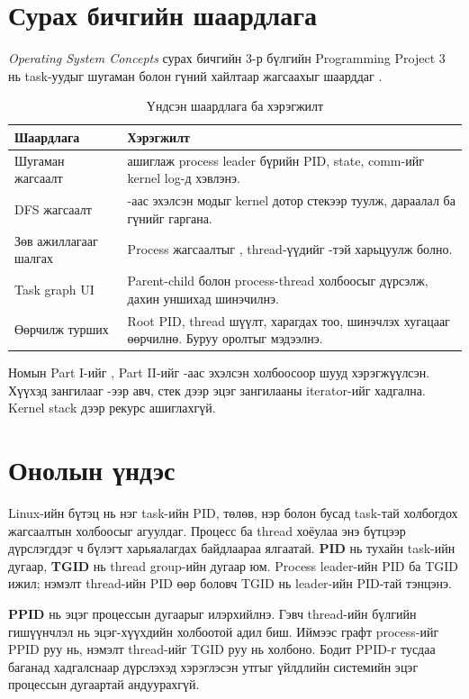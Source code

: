 \section{Сурах бичгийн шаардлага}
\textit{Operating System Concepts} сурах бичгийн 3-р бүлгийн Programming Project 3 нь task-уудыг шугаман болон гүний хайлтаар жагсаахыг шаарддаг \cite{osc}.
\begin{table}[H]
\centering\small
\caption{Үндсэн шаардлага ба хэрэгжилт}
\begin{tabularx}{\textwidth}{|P{3.25cm}|Y|}\hline
{}\textbf{Шаардлага} & \textbf{Хэрэгжилт} \\\hline
Шугаман жагсаалт &  ашиглаж process leader бүрийн PID, state, comm-ийг kernel log-д хэвлэнэ. \\\hline
DFS жагсаалт & -аас эхэлсэн модыг kernel дотор стекээр туулж, дараалал ба гүнийг гаргана. \\\hline
Зөв ажиллагааг шалгах & Process жагсаалтыг , thread-үүдийг -тэй харьцуулж болно. \\\hline
Task graph UI & Parent-child болон process-thread холбоосыг дүрсэлж, дахин уншихад шинэчилнэ. \\\hline
Өөрчилж турших & Root PID, thread шүүлт, харагдах тоо, шинэчлэх хугацааг өөрчилнө. Буруу оролтыг мэдээлнэ. \\\hline
\end{tabularx}
\end{table}
Номын Part I-ийг , Part II-ийг -аас эхэлсэн  холбоосоор шууд хэрэгжүүлсэн. Хүүхэд зангилааг -ээр авч, стек дээр эцэг зангилааны iterator-ийг хадгална. Kernel stack дээр рекурс ашиглахгүй.

\clearpage
\section{Онолын үндэс}
Linux-ийн  бүтэц нь нэг task-ийн PID, төлөв, нэр болон бусад task-тай холбогдох жагсаалтын холбоосыг агуулдаг. Процесс ба thread хоёулаа энэ бүтцээр дүрслэгддэг ч бүлэгт харьяалагдах байдлаараа ялгаатай. \textbf{PID} нь тухайн task-ийн дугаар, \textbf{TGID} нь thread group-ийн дугаар юм. Process leader-ийн PID ба TGID ижил; нэмэлт thread-ийн PID өөр боловч TGID нь leader-ийн PID-тай тэнцэнэ.

\textbf{PPID} нь эцэг процессын дугаарыг илэрхийлнэ. Гэвч thread-ийн бүлгийн гишүүнчлэл нь эцэг-хүүхдийн холбоотой адил биш. Иймээс графт process-ийг PPID руу нь, нэмэлт thread-ийг TGID руу нь холбоно. Бодит PPID-г тусдаа баганад хадгалснаар дүрслэхэд хэрэглэсэн  утгыг үйлдлийн системийн эцэг процессын дугаартай андуурахгүй.

